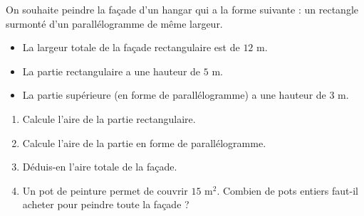 \documentclass[a4paper]{book}
\begin{document}
    
    \begin{exercice}
        On souhaite peindre la façade d'un hangar qui a la forme suivante : un rectangle surmonté d'un parallélogramme de même largeur.
        \begin{itemize}
            \item La largeur totale de la façade rectangulaire est de $12\text{ m}$.
            \item La partie rectangulaire a une hauteur de $5\text{ m}$.
            \item La partie supérieure (en forme de parallélogramme) a une hauteur de $3\text{ m}$.
        \end{itemize}
        \begin{enumerate}
            \item Calcule l'aire de la partie rectangulaire.
            \item Calcule l'aire de la partie en forme de parallélogramme.
            \item Déduis-en l'aire totale de la façade.
            \item Un pot de peinture permet de couvrir $15\text{ m}^2$. Combien de pots entiers faut-il acheter pour peindre toute la façade ?
        \end{enumerate}
    \end{exercice}
    
\end{document}
